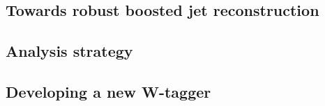 \subsection{Towards robust boosted jet reconstruction}
\subsection{Analysis strategy}
\subsection{Developing a new W-tagger}